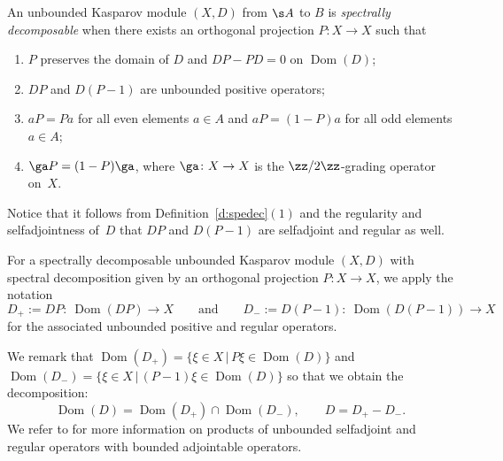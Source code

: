 \begin{dfn}\label{d:spedec}
An unbounded Kasparov module $(X,D)$ from $\s A$ to $B$ is \emph{spectrally decomposable} when there exists an orthogonal projection $P \colon X \to X$ such that
\begin{enumerate}\itemsep=0pt
\item[1)] $P$ preserves the domain of $D$ and $D P - P D = 0$ on $\operatorname{Dom}(D)$;
\item[2)] $D P$ and $D (P - 1)$ are unbounded positive operators;
\item[3)] $a P = P a$ for all even elements $a \in A$ and $a P = (1 - P) a$ for all odd elements $a \in A$;
\item[4)] $\ga P = (1 - P) \ga$, where $\ga\colon X \to X$ is the $\zz/2\zz$-grading operator on~$X$.
\end{enumerate}
\end{dfn}

Notice that it follows from Definition~\ref{d:spedec}$(1)$ and the regularity and selfadjointness of~$D$ that $DP$ and $D(P-1)$ are selfadjoint and regular as well.

For a spectrally decomposable unbounded Kasparov module $(X,D)$ with spectral decomposition given by an orthogonal projection $P\colon X \to X$, we apply the notation
\[
D_+ := DP \colon \ \operatorname{Dom}(DP) \to X \qquad \text{and} \qquad D_- := D(P - 1)\colon \ \operatorname{Dom}(D(P-1)) \to X
\]
for the associated unbounded positive and regular operators. %

We remark that $\operatorname{Dom}(D_+) = \{ \xi \in X \,|\, P \xi \in \operatorname{Dom}(D) \}$ and $\operatorname{Dom}(D_-) = \{ \xi \in X \,|\, (P - 1) \xi \in \operatorname{Dom}(D) \}$ so that we obtain the decomposition:
\[
\operatorname{Dom}(D) = \operatorname{Dom}(D_+) \cap \operatorname{Dom}(D_-), \qquad D = D_+ - D_- .
\]
We refer to \cite[Section~6]{Kaa:DAH} for more information on products of unbounded selfadjoint and regular operators with bounded adjointable operators.

